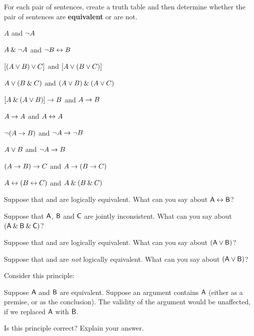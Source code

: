 \problempart
\label{pr.TT.equiv}
For each pair of sentences, create a truth table and then determine whether the pair of sentences are \textbf{equivalent} or are not. 
\begin{earg}
\item $A$ and ${\neg} A$
\item $A \mathbin{\&} {\neg} A$ and ${\neg} B \leftrightarrow B$
\item $[(A \vee B) \vee C]$ and $[A \vee (B \vee C)]$
\item $A \vee (B \mathbin{\&} C)$ and $(A \vee B) \mathbin{\&} (A \vee C)$
\item $[A \mathbin{\&} (A \vee B)] \rightarrow B$ and $A \rightarrow B$


\item $A\rightarrow A$ and $A \leftrightarrow A$
\item ${\neg}(A \rightarrow B)$ and ${\neg} A \rightarrow {\neg} B$
\item $A \vee B$ and ${\neg} A \rightarrow B$
\item$(A \rightarrow B) \rightarrow C$ and $A \rightarrow (B \rightarrow C)$
\item $A \leftrightarrow (B \leftrightarrow C)$ and $A \mathbin{\&} (B \mathbin{\&} C)$
\end{earg}


\problempart
\label{pr.TT.concepts}
\begin{earg}
\item Suppose that  and  are logically equivalent. What can you say about $\mathsf{A}\leftrightarrow\mathsf{B}$?

\item Suppose that $\mathsf{A}$, $\mathsf{B}$ and $\mathsf{C}$  are jointly inconsistent. What can you say about $(\mathsf{A}\mathbin{\&}\mathsf{B}\mathbin{\&}\mathsf{C})$?

\item Suppose that  and  are logically equivalent. What can you say about $(\mathsf{A}\vee\mathsf{B})$?

\item Suppose that  and  are \emph{not} logically equivalent. What can you say about $(\mathsf{A}\vee\mathsf{B})$?

\item Consider this principle:
	\begin{ebullet}
		\item[] Suppose $\mathsf{A}$ and $\mathsf{B}$ are equivalent. Suppose an argument contains $\mathsf{A}$ (either as a premise, or as the conclusion). The validity of the argument would be unaffected, if we replaced $\mathsf{A}$ with $\mathsf{B}$.
	\end{ebullet}
Is this principle correct? Explain your answer.
\end{earg}


